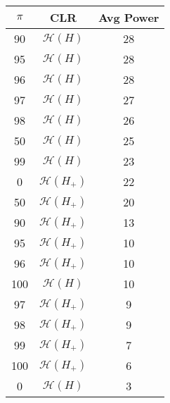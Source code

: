 \centering \begin{tabular}{c|c|c}
$\pi$	&CLR	&Avg Power\\\hline
90	&$\mathcal{H}(H)$	&28\\
95	&$\mathcal{H}(H)$	&28\\
96	&$\mathcal{H}(H)$	&28\\
97	&$\mathcal{H}(H)$	&27\\
98	&$\mathcal{H}(H)$	&26\\
50	&$\mathcal{H}(H)$	&25\\
99	&$\mathcal{H}(H)$	&23\\
0	&$\mathcal{H}(H_+)$	&22\\
50	&$\mathcal{H}(H_+)$	&20\\
90	&$\mathcal{H}(H_+)$	&13\\
95	&$\mathcal{H}(H_+)$	&10\\
96	&$\mathcal{H}(H_+)$	&10\\
100	&$\mathcal{H}(H)$	&10\\
97	&$\mathcal{H}(H_+)$	&9\\
98	&$\mathcal{H}(H_+)$	&9\\
99	&$\mathcal{H}(H_+)$	&7\\
100	&$\mathcal{H}(H_+)$	&6\\
0	&$\mathcal{H}(H)$	&3\\
\end{tabular}
